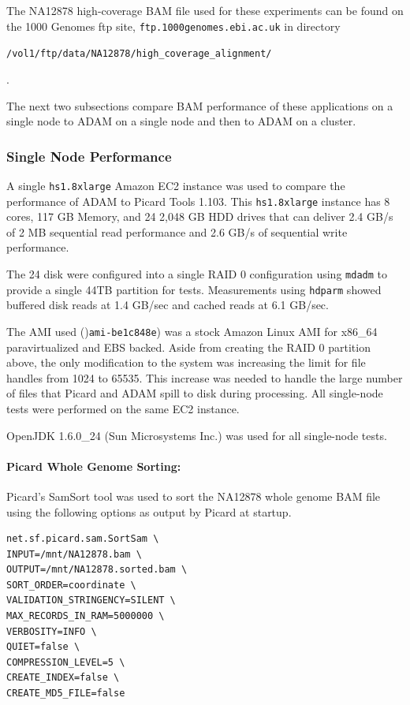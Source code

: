 \documentclass[10pt,twocolumn]{article}
\theoremstyle{plain}
\begin{document}
The NA12878 high-coverage BAM file used for these experiments can be found on the 1000 Genomes ftp site, 
\texttt{ftp.1000genomes.ebi.ac.uk} in directory \begin{small}\texttt{/vol1/ftp/data/NA12878/high\_coverage\_alignment/}\end{small}.

The next two subsections compare BAM performance of these applications on a single node to ADAM on a single node and then to ADAM on a cluster.

\subsubsection{Single Node Performance}

A single \texttt{hs1.8xlarge} Amazon EC2 instance was used to compare the performance of ADAM to Picard Tools 1.103.
This \texttt{hs1.8xlarge} instance has 8 cores, 117 GB Memory, and 24 2,048 GB HDD drives that can
deliver 2.4 GB/s of 2 MB sequential read performance and 2.6 GB/s of sequential write performance. 

The 24 disk were configured into a single RAID 0 configuration using \texttt{mdadm} to provide a single 44TB partition for tests.
Measurements using \texttt{hdparm} showed buffered disk reads at 1.4 GB/sec and cached reads at 6.1 GB/sec.

The AMI used ()\texttt{ami-be1c848e}) was a stock Amazon Linux AMI for x86\_64 paravirtualized and EBS backed. Aside
from creating the RAID 0 partition above, the only modification to the system was increasing the limit for file
handles from 1024 to 65535. This increase was needed to handle the large number of files that Picard and ADAM spill to disk during
processing. All single-node tests were performed on the same EC2 instance.

OpenJDK 1.6.0\_24 (Sun Microsystems Inc.) was used for all single-node tests.

\paragraph{Picard Whole Genome Sorting:}
\label{sec:single-sort-picard}

Picard's SamSort tool was used to sort the NA12878 whole genome BAM file using the following options as output
by Picard at startup.

\begin{lstlisting}
net.sf.picard.sam.SortSam \
INPUT=/mnt/NA12878.bam \
OUTPUT=/mnt/NA12878.sorted.bam \
SORT_ORDER=coordinate \
VALIDATION_STRINGENCY=SILENT \
MAX_RECORDS_IN_RAM=5000000 \
VERBOSITY=INFO \
QUIET=false \
COMPRESSION_LEVEL=5 \
CREATE_INDEX=false \
CREATE_MD5_FILE=false
\end{lstlisting}
\end{document}

